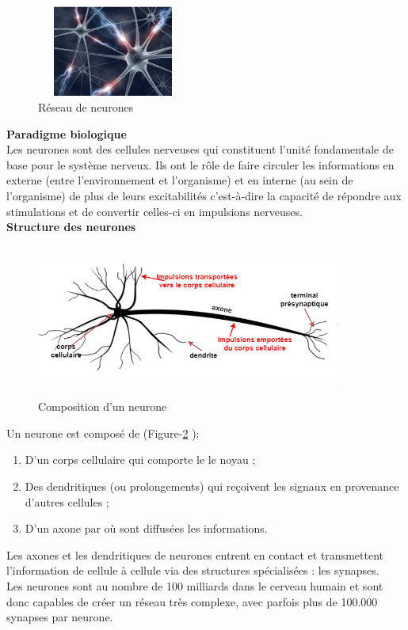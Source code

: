 \begin{figure}[h!]
      \centering
      \includegraphics[width=5cm,height=3cm]{images/neurone.png}
    \caption{Réseau de neurones}
    \label{fig:cc}
\end{figure}

{\textbf{Paradigme biologique}}\\

Les neurones sont des cellules nerveuses qui constituent l’unité fondamentale de base pour le système nerveux. Ils ont le rôle de faire circuler les informations en externe (entre l'environnement et l'organisme) et en interne (au sein de l'organisme) de plus de leurs excitabilités c'est-à-dire la capacité de répondre aux stimulations et de convertir celles-ci en impulsions nerveuses.\\
\newpage
{\textbf{Structure des neurones} }

\begin{figure}[h!]
      \centering
      \includegraphics[width=10cm,height=5cm]{images/neurone2.png}
    \caption{Composition d'un neurone}
    \label{fig:compp}
\end{figure}

Un neurone est composé de (Figure-\ref{fig:compp} ):
\begin{enumerate}
    \item D’un corps cellulaire qui comporte le le noyau ;
\item Des dendritiques (ou prolongements) qui reçoivent les signaux en provenance d’autres cellules ;
\item D’un axone par où sont diffusées les informations.
\end{enumerate}
Les axones et les dendritiques de neurones entrent en contact et transmettent l'information de cellule à cellule via des structures spécialisées : les synapses.\\
Les neurones sont au nombre de 100 milliards dans le cerveau humain et sont donc capables de créer un réseau très complexe, avec parfois plus de 100.000 synapses par neurone.\\

